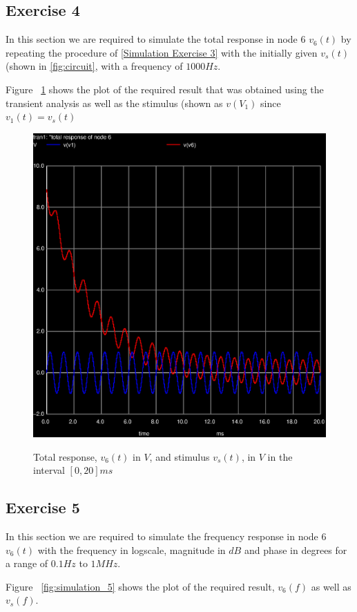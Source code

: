 \subsection{Exercise 4}
\label{Simulation Exercise 4}
In this section we are required to simulate the total response in node 6 $v_{6}(t)$ by repeating the procedure of \ref{Simulation Exercise 3} with the initially given $v_s(t)$ (shown in \ref{fig:circuit}, with a frequency of $1000 Hz$.

Figure ~\ref{fig:simulation_4} shows the plot of the required result that was obtained using the transient analysis as well as the stimulus (shown as $v(V_1)$ since $v_1(t) = v_s(t)$

\begin{figure}[!ht] \centering
\caption{Total response, $v_{6}(t)$ in $V$, and stimulus $v_s(t)$, in $V$ in the interval $[0,20]ms$}
\includegraphics[width=0.6\linewidth]{trans4.eps}
\label{fig:simulation_4}
\end{figure}

\subsection{Exercise 5}
\label{Simulation Exercise 5}
In this section we are required to simulate the frequency response in node 6 $v_{6}(t)$ with the frequency in logscale, magnitude in $dB$ and phase in degrees for a range of $0.1Hz$ to $1MHz$.

Figure ~\ref{fig:simulation_5} shows the plot of the required result, $v_6(f)$ as well as $v_s(f)$.

